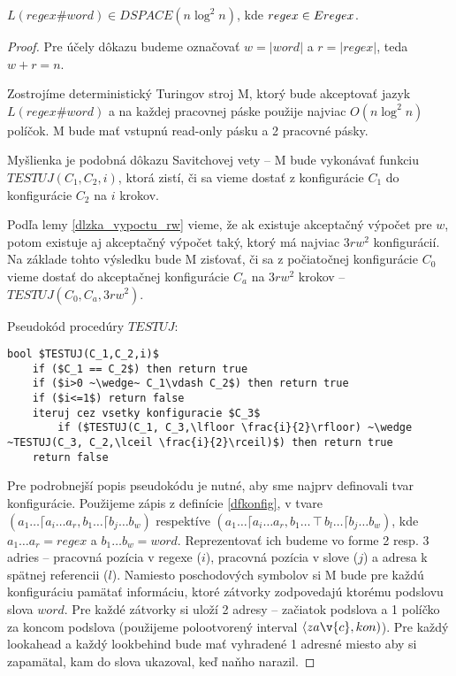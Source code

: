 \begin{veta}\label{dspace_nlog2n}
$L(regex\#word) \in DSPACE(n \log^2 n)$, kde $regex \in Eregex$.
\end{veta}
\begin{proof}
Pre účely dôkazu budeme označovať $w = |word|$ a $r = |regex|$, teda $w+r=n$.

Zostrojíme deterministický Turingov stroj M, ktorý bude akceptovať jazyk $L(regex\#word)$ a na každej pracovnej páske použije najviac $O(n\log^2 n)$ políčok. M bude mať vstupnú read-only pásku a 2 pracovné pásky.

Myšlienka je podobná dôkazu Savitchovej vety \cite{Savitch_skripta} -- M bude vykonávať funkciu $TESTUJ(C_1,C_2,i)$, ktorá zistí, či sa vieme dostať z konfigurácie $C_1$ do konfigurácie $C_2$ na $i$ krokov. 

Podľa lemy \ref{dlzka_vypoctu_rw} vieme, že ak existuje akceptačný výpočet pre $w$, potom existuje aj akceptačný výpočet taký, ktorý má najviac $3rw^2$ konfigurácií. Na základe tohto výsledku bude M zisťovať, či sa z počiatočnej konfigurácie $C_0$ vieme dostať do akceptačnej konfigurácie $C_a$ na $3rw^2$ krokov -- $TESTUJ(C_0,C_a,3rw^2)$.

Pseudokód procedúry $TESTUJ$:
\begin{lstlisting}[mathescape]
bool $TESTUJ(C_1,C_2,i)$
	if ($C_1 == C_2$) then return true
	if ($i>0 ~\wedge~ C_1\vdash C_2$) then return true
	if ($i<=1$) return false
	iteruj cez vsetky konfiguracie $C_3$
		if ($TESTUJ(C_1, C_3,\lfloor \frac{i}{2}\rfloor) ~\wedge ~TESTUJ(C_3, C_2,\lceil \frac{i}{2}\rceil)$) then return true
	return false
\end{lstlisting}

Pre podrobnejší popis pseudokódu je nutné, aby sme najprv definovali tvar konfigurácie. Použijeme zápis z definície \ref{dfkonfig}, v tvare $(a_1\dots \lceil a_i \dots a_r, b_1 \dots\lceil b_j \dots b_w)$ respektíve $(a_1\dots \lceil a_i \dots a_r, b_1 \ldots \intercal b_l \dots \lceil b_j \dots b_w)$, kde $a_1\dots a_r = regex$ a $b_1\dots b_w = word$. Reprezentovať ich budeme vo forme 2 resp. 3 adries -- pracovná pozícia v regexe ($i$), pracovná pozícia v slove ($j$) a adresa k spätnej referencii ($l$). Namiesto poschodových symbolov si M bude pre každú konfiguráciu pamätať informáciu, ktoré zátvorky zodpovedajú ktorému podslovu slova $word$. Pre každé zátvorky si uloží 2 adresy -- začiatok podslova a 1 políčko za koncom podslova (použijeme polootvorený interval $\langle za\v{c},kon)$). Pre každý lookahead a každý lookbehind bude mať vyhradené 1 adresné miesto aby si zapamätal, kam do slova ukazoval, keď naňho narazil.


\end{proof}

